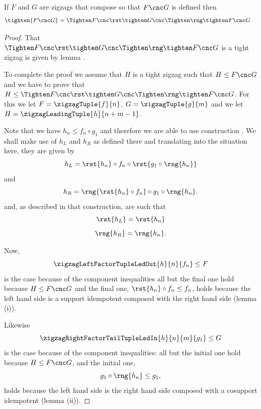 \begin{lemma}
If $F$ and $G$ are zigzags that compose so that
$F \cnc G$ is defined then
\begin{align*}
\tighten{F \cnc G} 
    &= \theTightening
\end{align*}
\end{lemma}
\begin{proof}
That  $\theTightening$ is a tight zigzag is given by 
lemma  .

To complete the proof we assume that $H$ is a tight zigzag such that $H \leq F \cnc G$ and we have to prove that 
$H \leq \theTightening$. For this we let
$F=\zigzagTuple{f}{n}$, $G=\zigzagTuple{g}{m}$
and we let $H=\zigzagLeadingTuple{h}{n+m-1}$.

Note that we have $h_n \leq f_n \circ g_1$ and therefore
we are able to
use construction . 
We shall make use of $h_L$ and $h_R$ as defined there and translating into the situation here, they are given by
\[
h_L = \rst{h_n} \circ f_n \circ \rst{g_1 \circ \rng{h_n}}
\]
and  
\newcommand{\hR}{\rng{\rst{h_n} \circ f_n} \circ g_1 \circ \rng{h_n}}
\[
h_R = \hR.
\]
and, as described in that construction, are such that
\begin{equation}
\label{rstOfhL}
\rst{h_L}=\rst{h_n}
\end{equation}
\begin{equation}
\label{rngOfhR}
\rng{h_R}=\rng{h_n}.
\end{equation}

Now,  
\begin{equation}
\label{inequalityOneLeft}
\zigzagLeftFactorTupleLedOut{h}{n}{f_n} \leq F
\end{equation}
is the case because of the component inequalities all but the final one hold because $H \leq F \cnc G$
and the final one, $\rst{h_n} \circ f_n \leq f_n$, holds because
the left hand side is a support idempotent composed 
with the right hand side (lemma  (i)).

Likewise
\begin{equation}
\label{inequalityOneRight}
\zigzagRightFactorTailTupleLedIn{h}{n}{m}{g_1} \leq G
\end{equation}
is the case because of the component inequalities: all but the initial one hold because
$H \leq F \cnc G$,
and the initial one,
\[
g_1 \circ \rng{h_n} \leq g_1,
\]
holds because the left hand side is the right hand side composed with a cosupport idempotent
(lemma  (ii)).


\end{proof}
